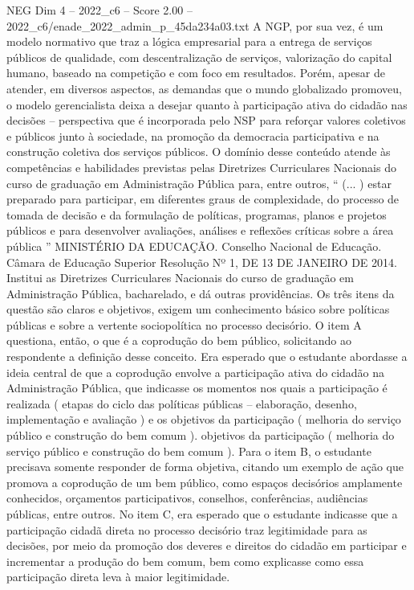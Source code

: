 \begin{textsample}{NEG Dim 4 – 2022\_c6 – Score 2.00 – 2022\_c6/enade\_2022\_admin\_p\_45da234a03.txt}
A NGP, por sua vez, é um modelo normativo que traz a lógica empresarial para a entrega de serviços públicos de qualidade, com descentralização de serviços, valorização do capital humano, baseado na competição e com foco em resultados.
Porém, apesar de atender, em diversos aspectos, as demandas que o mundo globalizado promoveu, o modelo gerencialista deixa a desejar quanto à participação ativa do cidadão nas decisões – perspectiva que é incorporada pelo NSP para reforçar valores coletivos e públicos junto à sociedade, na promoção da democracia participativa e na construção coletiva dos serviços públicos.
O domínio desse conteúdo atende às competências e habilidades previstas pelas Diretrizes Curriculares Nacionais do curso de graduação em Administração Pública para, entre outros, “ (... ) estar preparado para participar, em diferentes graus de complexidade, do processo de tomada de decisão e da formulação de políticas, programas, planos e projetos públicos e para desenvolver avaliações, análises e reflexões críticas sobre a área pública ” MINISTÉRIO DA EDUCAÇÃO.
Conselho Nacional de Educação.
Câmara de Educação Superior Resolução Nº 1, DE 13 DE JANEIRO DE 2014.
Institui as Diretrizes Curriculares Nacionais do curso de graduação em Administração Pública, bacharelado, e dá outras providências.
Os três itens da questão são claros e objetivos, exigem um conhecimento básico sobre políticas públicas e sobre a vertente sociopolítica no processo decisório.
O item A questiona, então, o que é a coprodução do bem público, solicitando ao respondente a definição desse conceito.
Era esperado que o estudante abordasse a ideia central de que a coprodução envolve a participação ativa do cidadão na Administração Pública, que indicasse os momentos nos quais a participação é realizada ( etapas do ciclo das políticas públicas – elaboração, desenho, implementação e avaliação ) e os objetivos da participação ( melhoria do serviço público e construção do bem comum ). objetivos da participação ( melhoria do serviço público e construção do bem comum ).
Para o item B, o estudante precisava somente responder de forma objetiva, citando um exemplo de ação que promova a coprodução de um bem público, como espaços decisórios amplamente conhecidos, orçamentos participativos, conselhos, conferências, audiências públicas, entre outros.
No item C, era esperado que o estudante indicasse que a participação cidadã direta no processo decisório traz legitimidade para as decisões, por meio da promoção dos deveres e direitos do cidadão em participar e incrementar a produção do bem comum, bem como explicasse como essa participação direta leva à maior legitimidade.

\end{textsample}
